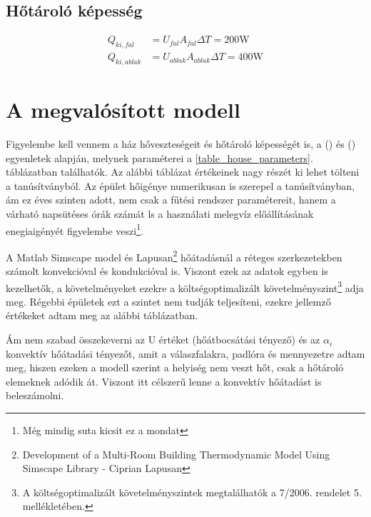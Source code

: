 \subsection*{Hőtároló képesség}

\begin{equation}\label{eq_hotarolo}
\begin{aligned}
Q_{ki,fal} &= U_{fal}A_{fal}\Delta T = 200\si{\watt}\\[10pt]
Q_{ki,ablak} &= U_{ablak}A_{ablak}\Delta T = 400\si{\watt}
\end{aligned}
\end{equation}



\section{A megvalósított modell}

Figyelembe kell vennem a ház hőveszteségeit és hőtároló képességét is, a () és () egyenletek alapján, melynek paraméterei a \ref{table_house_parameters}. táblázatban találhatók.
Az alábbi táblázat értékeinek nagy részét ki lehet tölteni a tanúsítványból.
Az épület hőigénye numerikusan is szerepel a tanúsítványban, ám ez éves szinten adott, nem csak a fűtési rendszer paramétereit, hanem a várható napsütéses órák számát ls a használati melegvíz előállításának enegiaigényét figyelembe veszi\footnote{Még mindig suta kicsit ez a mondat}.

A Matlab Simscape model és Lapusan\footnote{Development of a Multi-Room Building Thermodynamic Model Using Simscape Library - Ciprian Lapusan} hőátadásnál a réteges szerkezetekben számolt konvekcióval és kondukcióval is. Viszont ezek az adatok egyben is kezelhetők, a követelményeket ezekre a költségoptimalizált követelményszint\footnote{ A  költségoptimalizált követelményszintek megtalálhatók a 7/2006. rendelet \cite{TNM2006} 5. mellékletében.} adja meg. Régebbi épületek ezt a szintet nem tudják teljesíteni, ezekre jellemző értékeket adtam meg az alábbi táblázatban. 


Ám nem szabad összekeverni az U értéket (hőátbocsátási tényező) és az $\alpha_i$ konvektív hőátadási tényezőt, amit a válaszfalakra, padlóra és mennyezetre adtam meg, hiszen ezeken a modell szerint a helyiség nem veszt hőt, csak a hőtároló elemeknek adódik át. Viszont itt célszerű lenne a konvektív hőátadást is beleszámolni. 


